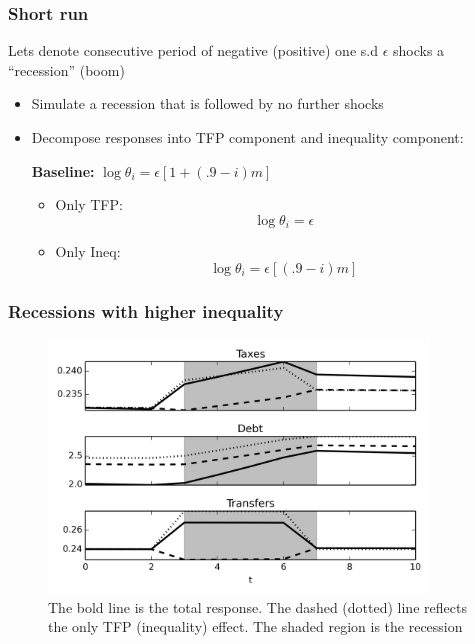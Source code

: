\documentclass{beamer}
\begin{document}
\begin{frame}
\frametitle{Short run}
Lets denote consecutive period of negative (positive) one s.d $\epsilon$ shocks a ``recession'' (boom)

\begin{itemize}
\item Simulate a recession that is followed by no further shocks
 
 \item Decompose responses into TFP component and inequality component:
  
 \vspace{3mm}
\centering  \textbf{Baseline:} $\log \theta_i=\epsilon [1+(.9-i)m]$
 \vspace{3mm}
 \begin{itemize}
  \item Only TFP: \[\log \theta_i=\epsilon\]
  \item Only Ineq: \[\log \theta_i=\epsilon [(.9-i)m]\]
\end{itemize}

\end{itemize}
 
\end{frame}


\begin{frame}
\frametitle{Recessions with higher inequality}
{
  \begin{figure}
    \centering
    \includegraphics[width = 0.9\textwidth]{cesplots/irf_bm_chi_shocks.png}
    \caption{The bold line is the total response. The dashed (dotted) line reflects the only TFP (inequality) effect. The shaded region is the recession}
  \end{figure}

} 
\end{frame}
\end{document}
